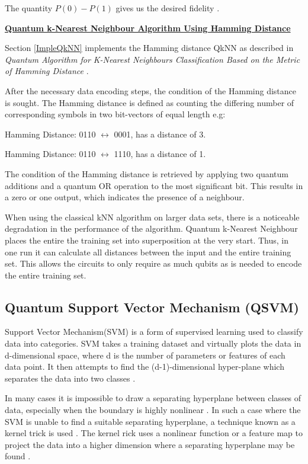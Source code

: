 The quantity $P(0) - P(1)$ gives us the desired fidelity \citep{QML}.

\vspace{0.4cm}
\textbf{\underline{Quantum k-Nearest Neighbour Algorithm Using Hamming Distance }}

Section \ref{ImpleQkNN} implements the Hamming distance QkNN as described in \emph{Quantum Algorithm for K-Nearest Neighbours Classification Based on the Metric of Hamming Distance} \citep{HammInstruct}.

After the necessary data encoding steps, the condition of the Hamming distance is sought. The Hamming distance is defined as counting the differing number of corresponding symbols in two bit-vectors of equal length e.g:
 
 Hamming Distance: 0110 $\leftrightarrow$ 0001, has a distance of 3.
 
 Hamming Distance: 0110 $\leftrightarrow$ 1110,  has a distance of 1.
 
The condition of the Hamming distance is retrieved by applying two quantum additions and a quantum OR operation to the most significant bit. This results in a zero or one output, which indicates the presence of a neighbour. 

When using the classical kNN algorithm on larger data sets, there is a noticeable degradation in the performance of the algorithm. 
Quantum k-Nearest Neighbour places the entire the training set into superposition at the very start. Thus, in one run it can calculate all distances between the input and the entire training set. This allows the circuits to only require as much qubits as is needed to encode the entire training set.


\subsection{ Quantum Support Vector Mechanism (QSVM)}

Support Vector Mechanism(SVM) is a form of supervised learning used to classify data into categories. SVM takes a training dataset and virtually plots the data in d-dimensional space, where d is the number of parameters or features of each data point. It then attempts to find the (d-1)-dimensional hyper-plane which separates the data into two classes \citep{C18}. %

In many cases it is impossible to draw a separating hyperplane between classes of data, especially when the boundary is highly nonlinear \citep{C18}. In such a case where the SVM is unable to find a suitable separating hyperplane, a technique known as a kernel trick is used \citep{qmlCovid}. The kernel rick uses a nonlinear function or a feature map to project the data into a higher dimension where a separating hyperplane may be found \citep{C20}.

